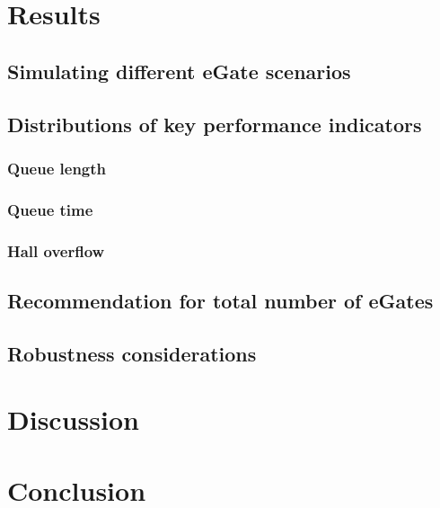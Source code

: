 \documentclass[12pt]{article}
\begin{document}
\section{Results}



\subsection{Simulating different eGate scenarios}

\subsection{Distributions of key performance indicators}

\subsubsection{Queue length}
\subsubsection{Queue time}
\subsubsection{Hall overflow}
 

\subsection{Recommendation for total number of eGates}

\subsection{Robustness considerations}

\section{Discussion}
\section{Conclusion}
% 
\end{document}
